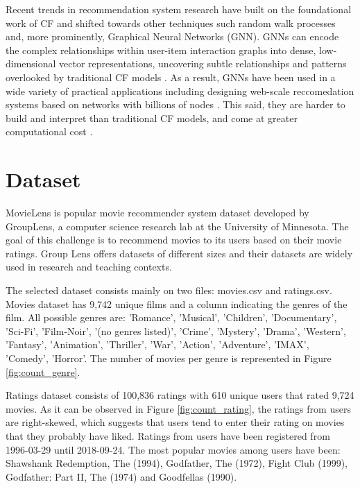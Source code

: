 \documentclass[12pt]{article}
\numberwithin{equation}{section}
\begin{document}
Recent trends in recommendation system research have built on the foundational work of CF and shifted towards other techniques such random walk processes \cite{prob_s} and, more prominently, Graphical Neural Networks (GNN). GNNs can encode the complex relationships within user-item interaction graphs into dense, low-dimensional vector representations,  uncovering subtle relationships and patterns overlooked by traditional CF models . As a result, GNNs have been used in a wide variety of practical applications including designing web-scale reccomedation systems based on networks with billions of nodes \cite{GNNwebscale}. This said, they are harder to build and interpret than traditional CF models, and come at greater computational cost \cite{collab_f}. 

\section{Dataset}

MovieLens is popular movie recommender system dataset developed by GroupLens, a computer science research lab at the University of Minnesota. The goal of this challenge is to recommend movies to its users based on their movie ratings. Group Lens offers datasets of different sizes and their datasets are widely used in research and teaching contexts.

The selected dataset consists mainly on two files: movies.csv and ratings.csv. Movies dataset has 9,742 unique films and a column indicating the genres of the film. All possible genres are: 'Romance', 'Musical', 'Children', 'Documentary', 'Sci-Fi', 'Film-Noir', '(no genres listed)', 'Crime', 'Mystery', 'Drama', 'Western', 'Fantasy', 'Animation', 'Thriller', 'War', 'Action', 'Adventure', 'IMAX', 'Comedy', 'Horror'. The number of movies per genre is represented in Figure \ref{fig:count_genre}.

Ratings dataset consists of 100,836 ratings with 610 unique users that rated 9,724 movies. As it can be observed in Figure \ref{fig:count_rating}, the ratings from users are right-skewed, which suggests that users tend to enter their rating on movies that they probably have liked. Ratings from users have been registered from 1996-03-29 until 2018-09-24. The most popular movies among users have been: Shawshank Redemption, The (1994), Godfather, The (1972), Fight Club (1999), Godfather: Part II, The (1974) and Goodfellas (1990).
\end{document}
